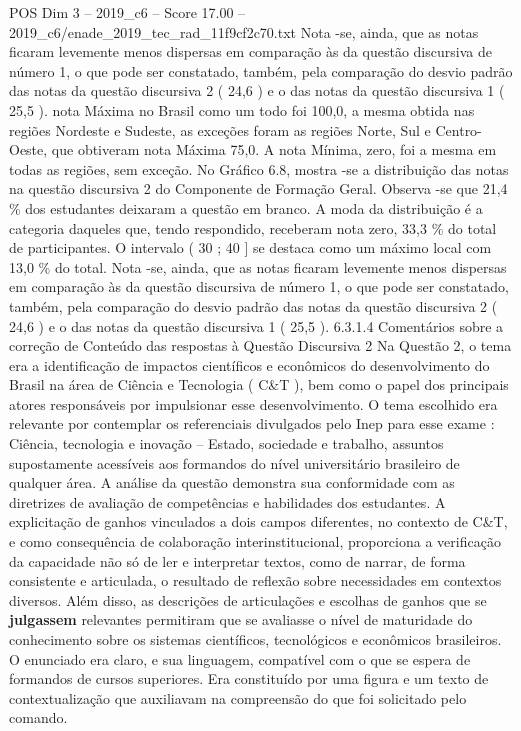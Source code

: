 \begin{textsample}{POS Dim 3 – 2019\_c6 – Score 17.00 – 2019\_c6/enade\_2019\_tec\_rad\_11f9cf2c70.txt}
Nota -se, ainda, que as notas ficaram levemente menos dispersas em comparação às da questão discursiva de número 1, o que pode ser constatado, também, pela comparação do desvio padrão das notas da questão discursiva 2 ( 24,6 ) e o das notas da questão discursiva 1 ( 25,5 ). nota Máxima no Brasil como um todo foi 100,0, a mesma obtida nas regiões Nordeste e Sudeste, as exceções foram as regiões Norte, Sul e Centro-Oeste, que obtiveram nota Máxima 75,0.
A nota Mínima, zero, foi a mesma em todas as regiões, sem exceção.
No Gráfico 6.8, mostra -se a distribuição das notas na questão discursiva 2 do Componente de Formação Geral.
Observa -se que 21,4 \% dos estudantes deixaram a questão em branco.
A moda da distribuição é a categoria daqueles que, tendo respondido, receberam nota zero, 33,3 \% do total de participantes.
O intervalo ( 30 ; 40 ] se destaca como um máximo local com 13,0 \% do total.
Nota -se, ainda, que as notas ficaram levemente menos dispersas em comparação às da questão discursiva de número 1, o que pode ser constatado, também, pela comparação do desvio padrão das notas da questão discursiva 2 ( 24,6 ) e o das notas da questão discursiva 1 ( 25,5 ). 6.3.1.4 Comentários sobre a correção de Conteúdo das respostas à Questão Discursiva 2 Na Questão 2, o tema era a identificação de impactos científicos e econômicos do desenvolvimento do Brasil na área de Ciência e Tecnologia ( C\&T ), bem como o papel dos principais atores responsáveis por impulsionar esse desenvolvimento.
O tema escolhido era relevante por contemplar os referenciais divulgados pelo Inep para esse exame : Ciência, tecnologia e inovação – Estado, sociedade e trabalho, assuntos supostamente acessíveis aos formandos do nível universitário brasileiro de qualquer área.
A análise da questão demonstra sua conformidade com as diretrizes de avaliação de competências e habilidades dos estudantes.
A explicitação de ganhos vinculados a dois campos diferentes, no contexto de C\&T, e como consequência de colaboração interinstitucional, proporciona a verificação da capacidade não só de ler e interpretar textos, como de narrar, de forma consistente e articulada, o resultado de reflexão sobre necessidades em contextos diversos.
Além disso, as descrições de articulações e escolhas de ganhos que se \textbf{julgassem} relevantes permitiram que se avaliasse o nível de maturidade do conhecimento sobre os sistemas científicos, tecnológicos e econômicos brasileiros.
O enunciado era claro, e sua linguagem, compatível com o que se espera de formandos de cursos superiores.
Era constituído por uma figura e um texto de contextualização que auxiliavam na compreensão do que foi solicitado pelo comando.

\end{textsample}
